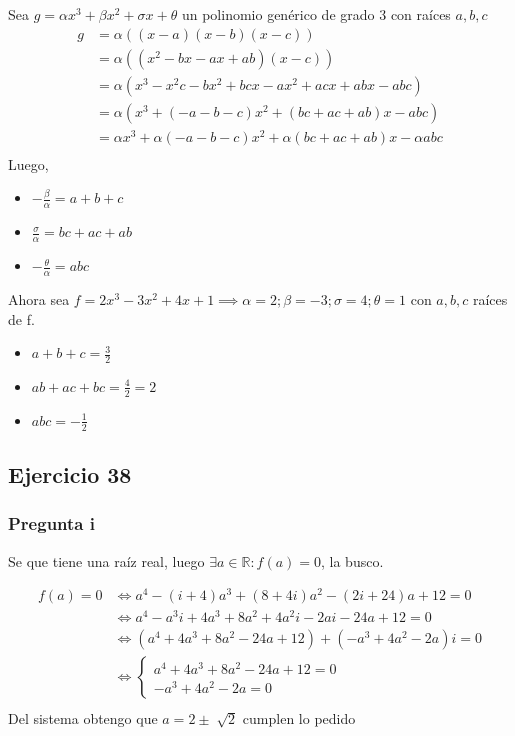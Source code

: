 Sea $ g = \alpha x^3 + \beta x^2 + \sigma x + \theta  $ un polinomio genérico de grado 3 con raíces $ a, b, c $
\begin{align*}
    g&= \alpha((x-a)(x-b)(x-c)) \\
    &= \alpha((x^2 - bx - ax + ab)(x-c)) \\
    &= \alpha(x^3 - x^2c - bx^2 + bcx - ax^2 + acx + abx - abc) \\
    &= \alpha(x^3 + (-a-b-c)x^2 + (bc+ac+ab)x - abc) \\
    &= \alpha x^3 + \alpha(-a-b-c)x^2 + \alpha(bc+ac+ab)x - \alpha abc \\
\end{align*}
Luego,
\begin{itemize}
    \item $ -\frac{\beta}{\alpha} = a+b+c $
    \item $ \frac{\sigma}{\alpha} = bc + ac + ab $
    \item $ -\frac{\theta}{\alpha} = abc $
\end{itemize}
Ahora sea $ f = 2x^3 - 3x^2 + 4x + 1 \implies \alpha = 2; \beta = -3; \sigma = 4; \theta = 1 $ con $ a,b,c $ raíces de f.

\begin{itemize}
    \item $ a+b+c = \frac{3}{2} $
    \item $ ab + ac + bc = \frac{4}{2} = 2 $
    \item $ abc = -\frac{1}{2} $
\end{itemize}

\subsection{Ejercicio 38}

\subsubsection{Pregunta i}
Se que tiene una raíz real, luego $ \exists a \in \mathbb{R}: f(a) = 0 $, la busco.

\begin{align*}
    f(a) = 0 &\iff a^4 - (i+4)a^3 + (8+4i)a^2 -  (2i+24)a + 12 = 0 \\
    &\iff a^4 - a^3i + 4a^3 + 8a^2 + 4a^2i - 2ai - 24a + 12 = 0 \\
    &\iff (a^4 + 4a^3 + 8a^2 - 24a + 12) + (- a^3 + 4a^2 - 2a)i  = 0 \\
    &\iff \begin{cases}
        a^4 + 4a^3 + 8a^2 - 24a + 12 = 0 \\
        - a^3 + 4a^2 - 2a = 0
    \end{cases} \\
\end{align*}
Del sistema obtengo que $ a = 2\pm\sqrt[]{2} $ cumplen lo pedido

